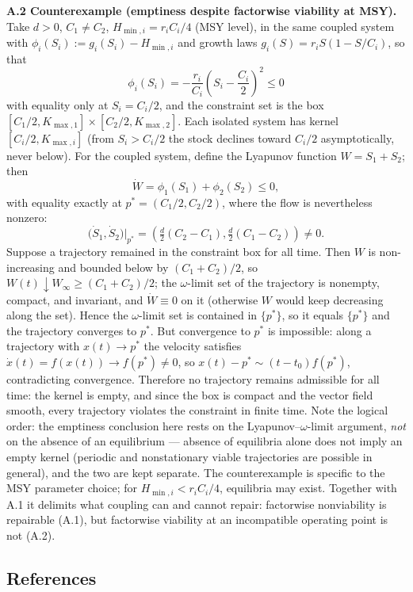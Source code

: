 \documentclass[11pt]{article}
\begin{document}
\textbf{A.2 Counterexample (emptiness despite factorwise viability at
MSY).} Take \(d > 0\), \(C_1 \ne C_2\), \(H_{\min,i} = r_i C_i / 4\)
(MSY level), in the same coupled system with
\(\phi_i(S_i) := g_i(S_i) - H_{\min,i}\) and growth laws
\(g_i(S) = r_i S (1 - S/C_i)\), so that
\[\phi_i(S_i) = -\frac{r_i}{C_i}\left(S_i - \frac{C_i}{2}\right)^2 \le 0\]
with equality only at \(S_i = C_i/2\), and the constraint set is the box
\([C_1/2, K_{\max,1}] \times [C_2/2, K_{\max,2}]\). Each isolated system
has kernel \([C_i/2, K_{\max,i}]\) (from \(S_i > C_i/2\) the stock
declines toward \(C_i/2\) asymptotically, never below). For the coupled
system, define the Lyapunov function \(W = S_1 + S_2\); then
\[\dot W = \phi_1(S_1) + \phi_2(S_2) \le 0,\] with equality exactly at
\(p^* = (C_1/2, C_2/2)\), where the flow is nevertheless nonzero:
\[\big(\dot S_1, \dot S_2\big)\big|_{p^*} = \left(\tfrac{d}{2}(C_2 - C_1), \tfrac{d}{2}(C_1 - C_2)\right) \ne 0.\]
Suppose a trajectory remained in the constraint box for all time. Then
\(W\) is non-increasing and bounded below by \((C_1 + C_2)/2\), so
\(W(t) \downarrow W_\infty \ge (C_1 + C_2)/2\); the \(\omega\)-limit set
of the trajectory is nonempty, compact, and invariant, and
\(\dot W \equiv 0\) on it (otherwise \(W\) would keep decreasing along
the set). Hence the \(\omega\)-limit set is contained in \(\{p^*\}\), so
it equals \(\{p^*\}\) and the trajectory converges to \(p^*\). But
convergence to \(p^*\) is impossible: along a trajectory with
\(x(t) \to p^*\) the velocity satisfies
\(\dot x(t) = f(x(t)) \to f(p^*) \ne 0\), so
\(x(t) - p^* \sim (t - t_0) f(p^*)\), contradicting convergence.
Therefore no trajectory remains admissible for all time: the kernel is
empty, and since the box is compact and the vector field smooth, every
trajectory violates the constraint in finite time. Note the logical
order: the emptiness conclusion here rests on the
Lyapunov--\(\omega\)-limit argument, \emph{not} on the absence of an
equilibrium --- absence of equilibria alone does not imply an empty
kernel (periodic and nonstationary viable trajectories are possible in
general), and the two are kept separate. The counterexample is
specific to the MSY parameter choice; for \(H_{\min,i} < r_i C_i / 4\),
equilibria may exist. Together with A.1 it delimits what coupling can
and cannot repair: factorwise nonviability is repairable (A.1), but
factorwise viability at an incompatible operating point is not (A.2).

\subsection{References}\label{references}
\end{document}

